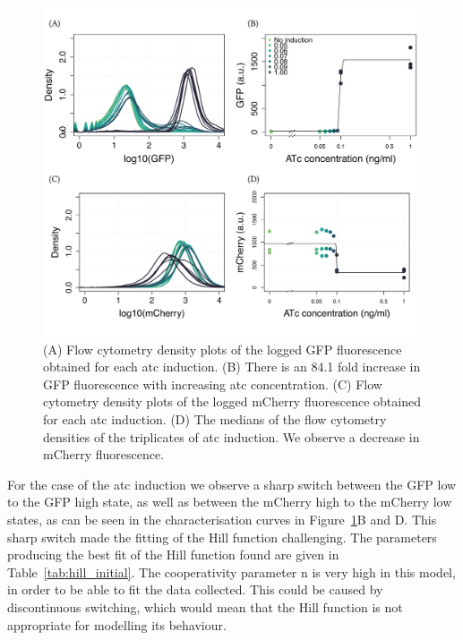 \begin{figure}[tb]
	\begin{center}
\includegraphics[width=\textwidth]{../../chapters/chapterABCFlow/images/pKDL071_concentrations_ATc-01.png}
\caption[Characterisation of pKDL071 after \acrshort{atc} induction]{\label{fig:switch_concentrations_model_atc} (A) Flow cytometry density plots of the logged GFP fluorescence obtained for each \acrshort{atc} induction. (B) There is an 84.1 fold increase in GFP fluorescence with increasing \acrshort{atc} concentration. (C) Flow cytometry density plots of the logged mCherry fluorescence obtained for each \acrshort{atc} induction. (D) The medians of the flow cytometry densities of the triplicates of \acrshort{atc} induction. We observe a decrease in mCherry fluorescence.}
\end{center}
\end{figure}

For the case of the \acrshort{atc} induction we observe a sharp switch between the GFP low to the GFP high state, as well as between the mCherry high to the mCherry low states, as can be seen in the characterisation curves in Figure~\ref{fig:switch_concentrations_model_atc}B and D. This sharp switch made the fitting of the Hill function challenging. The parameters producing the best fit of the Hill function found are given in Table~\ref{tab:hill_initial}. The cooperativity parameter n is very high in this model, in order to be able to fit the data collected. This could be caused by discontinuous switching, which would mean that the Hill function is not appropriate for modelling its behaviour. 

